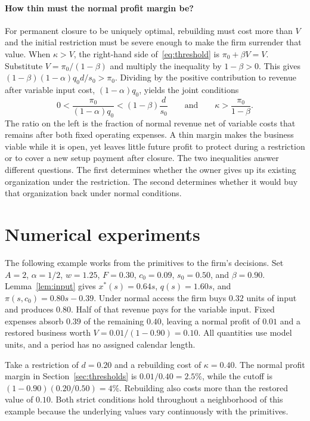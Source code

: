 \documentclass[11pt,letterpaper]{article}
\begin{document}
\paragraph{How thin must the normal profit margin be?}
For permanent closure to be uniquely optimal, rebuilding must cost more than $V$ and the initial restriction must be severe enough to make the firm surrender that value. When $\kappa>V$, the right-hand side of~\eqref{eq:threshold} is $\pi_0+\beta V=V$. Substitute $V=\pi_0/(1-\beta)$ and multiply the inequality by $1-\beta>0$. This gives $(1-\beta)(1-\alpha)q_0d/s_0>\pi_0$. Dividing by the positive contribution to revenue after variable input cost, $(1-\alpha)q_0$, yields the joint conditions
\[
\boxed{\quad 0<\frac{\pi_0}{(1-\alpha)q_0}<(1-\beta)\frac d{s_0}
       \qquad\text{and}\qquad \kappa>\frac{\pi_0}{1-\beta}.\quad}
\]
The ratio on the left is the fraction of normal revenue net of variable costs that remains after both fixed operating expenses. A thin margin makes the business viable while it is open, yet leaves little future profit to protect during a restriction or to cover a new setup payment after closure. The two inequalities answer different questions. The first determines whether the owner gives up its existing organization under the restriction. The second determines whether it would buy that organization back under normal conditions.

\section{Numerical experiments}\label{sec:numerical}
The following example works from the primitives to the firm's decisions. Set $A=2$, $\alpha=1/2$, $w=1.25$, $F=0.30$, $c_0=0.09$, $s_0=0.50$, and $\beta=0.90$. Lemma~\ref{lem:input} gives $x^*(s)=0.64s$, $q(s)=1.60s$, and $\pi(s,c_0)=0.80s-0.39$. Under normal access the firm buys $0.32$ units of input and produces $0.80$. Half of that revenue pays for the variable input. Fixed expenses absorb $0.39$ of the remaining $0.40$, leaving a normal profit of $0.01$ and a restored business worth $V=0.01/(1-0.90)=0.10$. All quantities use model units, and a period has no assigned calendar length.

Take a restriction of $d=0.20$ and a rebuilding cost of $\kappa=0.40$. The normal profit margin in Section~\ref{sec:thresholds} is $0.01/0.40=2.5\%$, while the cutoff is $(1-0.90)(0.20/0.50)=4\%$. Rebuilding also costs more than the restored value of $0.10$. Both strict conditions hold throughout a neighborhood of this example because the underlying values vary continuously with the primitives.
\end{document}
